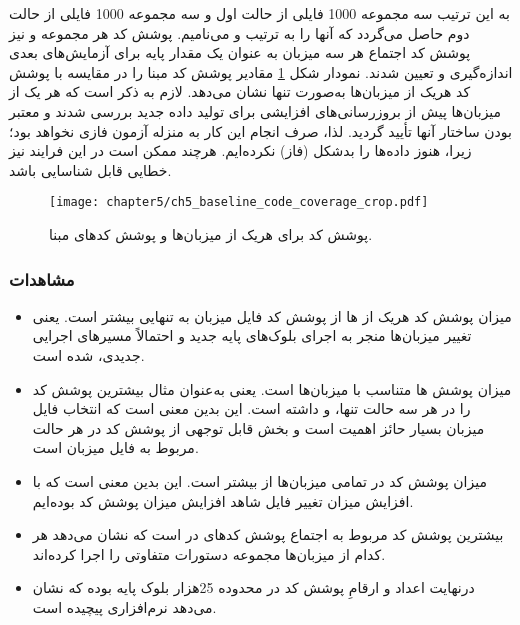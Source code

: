    به این ترتیب سه مجموعه 1000 فایلی از حالت اول و سه مجموعه 1000 فایلی از حالت دوم حاصل  می‌گردد که آنها را به ترتیب 
   و
   می‌نامیم. پوشش کد هر مجموعه و نیز پوشش کد اجتماع هر سه میزبان به عنوان یک مقدار پایه برای آزمایش‌های بعدی اندازه‌گیری و تعیین شدند. نمودار شکل \ref{ch5_baseline_code_coverage_crop.pdf} مقادیر پوشش کد مبنا را در مقایسه با پوشش کد هریک از میزبان‌ها به‌صورت تنها نشان می‌دهد. لازم به ذکر است که هر یک از میزبان‌ها پیش از بروزرسانی‌های افزایشی برای تولید داده جدید بررسی شدند و معتبر بودن ساختار آنها تأیید گردید. لذا، صرف انجام این کار به منزله آزمون فازی نخواهد بود؛ زیرا، هنوز داده‌ها را بدشکل (فاز) نکرده‌ایم. هرچند ممکن است در این فرایند نیز خطایی قابل شناسایی باشد.
   
 
 
 \begin{figure}%
 	\centering
 	\texttt{[image: chapter5/ch5\_baseline\_code\_coverage\_crop.pdf]}
 	\caption[پوشش کد برای هریک از میزبان‌ها و پوشش کدهای مبنا]
 	{
 		پوشش کد برای هریک از میزبان‌ها و پوشش کدهای مبنا.
 	}
 	\label{ch5_baseline_code_coverage_crop.pdf}
 \end{figure}
 
 
 \subsubsection{مشاهدات}
 
 \begin{itemize}
 	\item{
 	میزان پوشش کد هریک از ها از پوشش کد فایل میزبان به تنهایی بیشتر است. یعنی تغییر میزبان‌ها منجر به اجرای بلوک‌های پایه جدید و احتمالاً مسیرهای اجرایی جدیدی، شده است.
 
}
\item {
میزان پوشش ها متناسب با میزبان‌ها است. یعنی به‌عنوان مثال  بیشترین پوشش کد را در هر سه حالت تنها،  و  داشته است. این بدین معنی است که انتخاب فایل میزبان بسیار حائز اهمیت است و بخش قابل توجهی از پوشش کد در هر حالت مربوط به فایل میزبان است.

}

\item {
	میزان پوشش کد  در تمامی میزبان‌ها از  بیشتر است. این بدین معنی است که با افزایش میزان تغییر فایل شاهد افزایش میزان پوشش کد بوده‌ایم.
	
}

\item {
	 بیشترین پوشش کد مربوط به اجتماع پوشش کدهای   در  است که نشان می‌دهد هر کدام از میزبان‌ها مجموعه دستورات متفاوتی را اجرا کرده‌اند.
	
}

\item {
	درنهایت اعداد و ارقامِ پوشش کد در محدوده 25هزار بلوک پایه بوده که نشان می‌دهد  نرم‌افزاری پیچیده است.
}

 \end{itemize}
 

